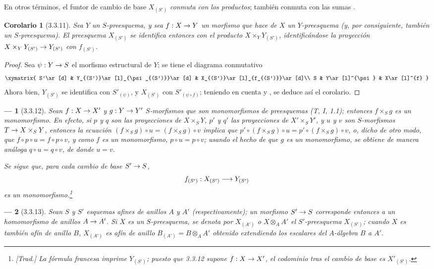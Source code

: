 \documentclass[oneside]{amsart}
\theoremstyle{ega-env-style}
\newtheorem*{env}{---}
\theoremstyle{ega-thm-env-style}
\newtheorem*{corollary}{Corolario}
\theoremstyle{ega-defn-env-style}
\renewcommand{\to}{\mathchoice{\longrightarrow}{\rightarrow}{\rightarrow}{\rightarrow}}
\newcommand{\oldpage}[2][]{{\marginnote{\normalfont{\textbf{#1}~|~#2}}}\ignorespaces}
\let\EGAOriginalLabel\label
\renewcommand{\label}[1]{\phantomsection\EGAOriginalLabel{#1}}
\begin{document}
En otros términos, el funtor de cambio de base $X_{(S')}$ \emph{conmuta con
los productos}; también conmuta con las sumas .

\begin{corollary}[3.3.11]
\label{I.3.3.11}
Sea $Y$ un $S$-preesquema, y sea $f:X\to Y$ un morfismo que hace de $X$ un
$Y$-preesquema (y, por consiguiente, también un $S$-preesquema). El preesquema $X_{(S')}$
se identifica entonces con el producto $X\times_Y Y_{(S')}$, identificándose la proyección
$X\times_Y Y_{(S')}\to Y_{(S')}$ con $f_{(S')}$. 
\end{corollary}

\begin{proof}
Sea $\psi:Y\to S$ el morfismo estructural de $Y$; se tiene el diagrama conmutativo
\label{I.3.3.11.diagram-fr}
\[
  \xymatrix{
    S'\ar[d] &
    Y_{(S')}\ar[l]_{\psi_{(S')}}\ar[d] &
    X_{(S')}\ar[l]_{f_{(S')}}\ar[d]\\
    S & Y\ar[l]^{\psi} & X\ar[l]^{f}
  }
\]
Ahora bien, $Y_{(S')}$ se identifica con $S'_{(\psi)}$, y $X_{(S')}$ con
$S'_{(\psi\circ f)}$; teniendo en cuenta  y
, se deduce así el corolario.
\end{proof}
\begin{env}[3.3.12]
\label{I.3.3.12}
Sean $f:X\to X'$ y $g:Y\to Y'$ $S$-morfismos que son \emph{monomorfismos}
de preesquemas (T, I, 1.1); entonces $f\times_S g$ es un \emph{monomorfismo}. En efecto,
si $p$ y $q$ son las proyecciones de $X\times_S Y$, $p'$ y $q'$ las proyecciones de
$X'\times_S Y'$, y $u$ y $v$ son $S$-morfismos $T\to X\times_S Y$, entonces la
ecuación $(f\times_S g)\circ u=(f\times_S g)\circ v$ implica que
$p'\circ(f\times_S g)\circ u=p'\circ(f\times_S g)\circ v$, o, dicho de otro modo, que
$f\circ p\circ u=f\circ p\circ v$, y como $f$ es un monomorfismo,
$p\circ u=p\circ v$; usando el hecho de que $g$ es un monomorfismo, se obtiene de manera análoga
$q\circ u=q\circ v$, de donde $u=v$.

\oldpage[I]{111}
Se sigue que, para cada cambio de base $S'\to S$,
\label{I.3.3.12.base-change-monomorphism-fr}
\[
  f_{(S')}:X_{(S')}\to Y_{(S')}
\]
es un monomorfismo.\footnote{\emph{[Trad.] La fórmula francesa imprime
$Y_{(S')}$; puesto que 3.3.12 supone $f:X\to X'$, el codominio tras el cambio de base es
$X'_{(S')}$.}}
\end{env}

\begin{env}[3.3.13]
\label{I.3.3.13}
Sean $S$ y $S'$ esquemas afines de anillos $A$ y $A'$ (respectivamente); un morfismo
$S'\to S$ corresponde entonces a un homomorfismo de anillos $A\to A'$. Si $X$ es un
$S$-preesquema, se denota por $X_{(A')}$ o $X\otimes_A A'$ el $S'$-preesquema
$X_{(S')}$; cuando $X$ es también afín de anillo $B$, $X_{(A')}$ es afín de anillo
$B_{(A')}=B\otimes_A A'$ obtenido extendiendo los escalares del $A$-álgebra
$B$ a $A'$.
\end{env}
\end{document}
